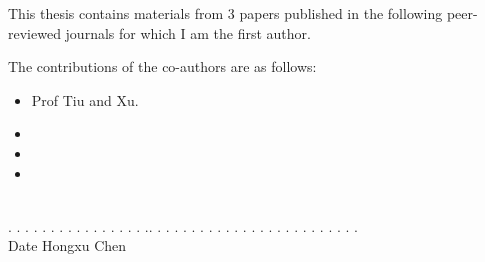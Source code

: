 \noindent This thesis contains materials from 3 papers published in the following peer-reviewed journals for which I am the first author.


\noindent The contributions of the co-authors are as follows:
\begin{itemize}
  \item Prof Tiu and Xu.
  \item 
  \item 
  \item 
\end{itemize}

\vspace{150pt}


 \ \   \qquad \qquad \qquad \qquad\qquad\qquad\qquad\qquad\quad \\
. . . . . . . . . . . . . . . . .\qquad \qquad \qquad \qquad\qquad \qquad . . . .  . . . . . . . . . . . . . . . . . . . . .\\
\indent \qquad Date \qquad \qquad \qquad  \qquad \qquad \qquad\qquad\qquad\qquad\qquad Hongxu Chen

